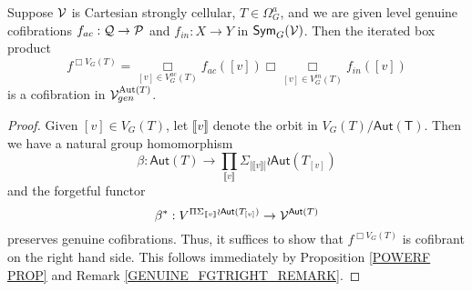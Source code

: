 \documentclass[a4paper,10pt]{article}%
\begin{document}
\begin{proposition}
\label{GENUINE_TREE_BOX_COFIBRANT_PROP} 
  Suppose $\V$ is Cartesian strongly cellular, $T\in \Omega_G^a$, and we are given level genuine cofibrations $f_{ac}: \mathcal Q \to \P$ and $f_{in}: X \to Y$ in $\Sym_G(\V)$. Then the iterated box product
  \[ 
  f^{\Box V_G(T)} = \mathop{\Box}\limits_{[v] \in V_G^{ac}(T)} f_{ac}([v]) \Box \mathop{\Box}\limits_{[v]\in V_G^{in}(T)}f_{in}([v]) 
  \] 
  is a cofibration in $\V^{\mathrm{Aut}(T)}_{gen}$.  
\end{proposition}
\begin{proof}
        Given $[v]\in V_G(T)$, let $\llbracket v \rrbracket$ denote the orbit in $V_G(T)/\mathsf{Aut(T)}$. Then we have a natural group homomorphism
        \[ 
        \beta: \mathsf{Aut}(T) \to \prod\limits_{\llbracket v \rrbracket} \Sigma_{|\llbracket v \rrbracket |} \wr \mathsf{Aut}(T_{[v]})
        \]
        and the forgetful functor 
        \[
        \beta^*: V^{\Pi \Sigma_{\llbracket v \rrbracket} \wr \mathsf{Aut}(T_{[v]})} \to \V^{\mathsf{Aut}(T)}
        \]
        preserves genuine cofibrations. Thus, it suffices to show that $f^{\Box V_G(T)}$ is cofibrant on the right hand side. This follows immediately by Proposition \ref{POWERF PROP} and Remark \ref{GENUINE_FGTRIGHT_REMARK}.




\end{proof}
\end{document}
